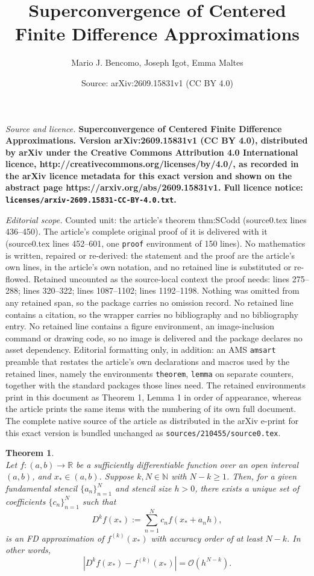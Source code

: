 \documentclass[10pt,a4paper]{amsart}
\title{\Large\bf Superconvergence of Centered Finite Difference Approximations}
\author{Mario J. Bencomo, Joseph Igot, Emma Maltes}
\date{Source: arXiv:2609.15831v1 (CC BY 4.0)}
\newtheorem{theorem}{Theorem}
\newcommand{\FD}{D}
\newcommand{\N}{\mathbb{N}}
\newcommand{\R}{\mathbb{R}}
\newcommand{\xstar}{x_*}
\begin{document}
\maketitle

\noindent\emph{Source and licence.} \Large\bf Superconvergence of Centered Finite Difference Approximations. Version arXiv:2609.15831v1 (CC BY 4.0), distributed by arXiv under the Creative Commons Attribution 4.0 International licence, http://creativecommons.org/licenses/by/4.0/, as recorded in the arXiv licence metadata for this exact version and shown on the abstract page https://arxiv.org/abs/2609.15831v1. Full licence notice: \texttt{licenses/arxiv-2609.15831-CC-BY-4.0.txt}.\par\smallskip

\noindent\textit{Editorial scope.} Counted unit: the article's theorem thm:SCodd (source0.tex lines 436--450). The article's complete original proof of it is delivered with it (source0.tex lines 452--601, one \texttt{proof} environment of 150 lines). No mathematics is written, repaired or re-derived: the statement and the proof are the article's own lines, in the article's own notation, and no retained line is substituted or re-flowed.  Retained uncounted as the source-local context the proof needs: lines 275--288; lines 320--322; lines 1087--1102; lines 1192--1198.  Nothing was omitted from any retained span, so the package carries no omission record.  No retained line contains a citation, so the wrapper carries no bibliography and no bibliography entry.  No retained line contains a figure environment, an image-inclusion command or drawing code, so no image is delivered and the package declares no asset dependency.  Editorial formatting only, in addition: an AMS \texttt{amsart} preamble that restates the article's own declarations and macros used by the retained lines, namely the environments \texttt{theorem}, \texttt{lemma} on separate counters, together with the standard packages those lines need.  The retained environments print in this document as Theorem 1, Lemma 1 in order of appearance, whereas the article prints the same items with the numbering of its own full document.  The complete native source of the article as distributed in the arXiv e-print for this exact version is bundled unchanged as \texttt{sources/210455/source0.tex}.
\begin{theorem}\label{thm:stand_conv}
\\
Let $f:(a,b)\to\R$ be a sufficiently differentiable function over an open interval $(a,b)$, and $\xstar\in(a,b)$.
Suppose $k,N\in\N$ with $N-k\ge 1$.
Then, for a given fundamental stencil $\{a_n\}_{n=1}^N$ and stencil size $h>0$, there exists a unique set of coefficients $\{c_n\}_{n=1}^N$ such that
\begin{equation}\label{eq:FDappx}
	\FD^k f(\xstar) := \sum_{n=1}^N c_n f(\xstar+a_nh),
\end{equation}
is an FD approximation of $f^{(k)}(\xstar)$ with accuracy order of at least $N-k$.
In other words,
\[
	\left| \FD^k f(\xstar) - f^{(k)}(\xstar) \right| =\mathcal{O}(h^{N-k}).
\]
\end{theorem}
\end{document}
